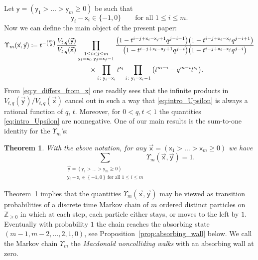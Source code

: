 \documentclass[pdftex]{sigma}
\numberwithin{equation}{section}
\newtheorem{Theorem}{Theorem}[section]
\begin{document}
Let $\mathsf{y}=(\mathsf{y}_1>\dots>\mathsf{y}_m\ge0 )$
be such that
\begin{equation}\label{eq:y_differs_from_x}
	\mathsf{y}_i-\mathsf{x}_i\in \{ -1,0 \}
	\qquad
	\text{for all $1\le i\le m$}.
\end{equation}
Now we can define the main object of the present paper:
\begin{gather}
\Upsilon_m(\vec{\mathsf{x}},\vec{\mathsf{y}})
		\coloneqq
		t^{-\binom m2}	
		\hspace{1pt}
		\frac
		{V_{t,q}(\vec{\mathsf{y}})}
		{V_{t,q}(\vec{\mathsf{x}})}
		\prod_{\substack{1\le i<j\le m
		\\
		\mathsf{y}_{i}=\mathsf{x}_{i}
		,\,
		\mathsf{y}_{j}=\mathsf{x}_{j}-1}}
		\frac{\big(1-t^{i-j+\mathsf{x}_{i}-\mathsf{x}_{j}+1}
		q^{j-i-1}\big)
		\big(1-t^{i-j+\mathsf{x}_{i}-\mathsf{x}_{j}} q^{j-i+1}\big)}
		{\big(1-t^{i-j+\mathsf{x}_{i}-\mathsf{x}_{j}+1} q^{j-i}\big)
		\big(1-t^{i-j+\mathsf{x}_{i}-\mathsf{x}_{j}} q^{j-i}\big)}
		\nonumber\\
\hphantom{\Upsilon_m(\vec{\mathsf{x}},\vec{\mathsf{y}}) \coloneqq}{}
\times\prod_{i\colon \mathsf{y}_i=\mathsf{x}_i}
		t^{\mathsf{x}_i}
		\prod_{i\colon \mathsf{y}_i=\mathsf{x}_i-1}
		\big(t^{m-i}-q^{m-i}t^{\mathsf{x}_i}\big)		.\label{eq:intro_Upsilon}
\end{gather}
From \eqref{eq:y_differs_from_x}
one readily sees that the infinite products in
${V_{t,q}(\vec{\mathsf{y}})}/{V_{t,q}(\vec{\mathsf{x}})}$
cancel out in such a way that
\eqref{eq:intro_Upsilon} is always a rational function of $q$, $t$.
Moreover, for $0<q,t<1$ the quantities \eqref{eq:intro_Upsilon}
are nonnegative.
One of our main results is the sum-to-one identity for the
$\Upsilon_m$'s:
\begin{Theorem}
	\label{thm:Macdonald_noncolliding_intro}
	With the above notation,
	for any $\vec{\mathsf{x}}=(\mathsf{x}_1>\dots>\mathsf{x}_m\ge0 )$
	we have
	\begin{equation*}
		\sum_{
			\substack{\vec{\mathsf{y}}=
			(\mathsf{y}_1>\dots>\mathsf{y}_m\ge0 )
			\\
			\mathsf{y}_i-\mathsf{x}_i\in \left\{ -1,0 \right\}
			\
			\text{for all $1\le i\le m$}
			}
		}
		\Upsilon_m(\vec{\mathsf{x}},\vec{\mathsf{y}})=1.
	\end{equation*}
\end{Theorem}
Theorem~\ref{thm:Macdonald_noncolliding_intro} implies that
the quantities
$\Upsilon_m(\vec{\mathsf{x}},\vec{\mathsf{y}})$
may be viewed as
transition probabilities of a discrete time Markov chain
of $m$ ordered distinct particles
on $\mathbb{Z}_{\ge0}$ in which at
each step, each particle either stays, or moves to the left by $1$.
Eventually with probability $1$ the chain reaches the
absorbing state $(m-1,m-2,\dots,2,1,0 )$,
see Proposition~\ref{prop:absorbing_wall}
below.
We call the Markov chain $\Upsilon_m$ the \emph{Macdonald
noncolliding walks} with an absorbing wall at zero.
\end{document}
